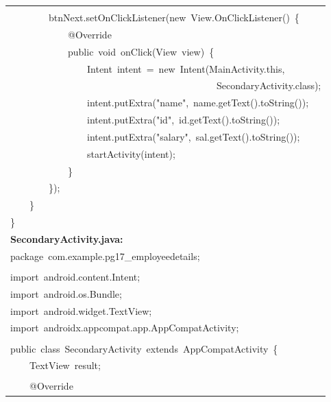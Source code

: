 \documentclass[a4paper,12pt]{article}
\begin{document}
\begin{longtable}{|p{}|}
\strut \\
{\ttfamily\small \ \ \ \ \ \ \ \ btnNext.setOnClickListener(new\ View.OnClickListener()\ \{} \\
{\ttfamily\small \ \ \ \ \ \ \ \ \ \ \ \ @Override} \\
{\ttfamily\small \ \ \ \ \ \ \ \ \ \ \ \ public\ void\ onClick(View\ view)\ \{} \\
{\ttfamily\small \ \ \ \ \ \ \ \ \ \ \ \ \ \ \ \ Intent\ intent\ =\ new\ Intent(MainActivity.this,\ } \\
{\ttfamily\small \ \ \ \ \ \ \ \ \ \ \ \ \ \ \ \ \ \ \ \ \ \ \ \ \ \ \ \ \ \ \ \ \ \ \ \ \ \ \ \ \ \ \ SecondaryActivity.class);} \\
{\ttfamily\small \ \ \ \ \ \ \ \ \ \ \ \ \ \ \ \ intent.putExtra("name",\ name.getText().toString());} \\
{\ttfamily\small \ \ \ \ \ \ \ \ \ \ \ \ \ \ \ \ intent.putExtra("id",\ id.getText().toString());} \\
{\ttfamily\small \ \ \ \ \ \ \ \ \ \ \ \ \ \ \ \ intent.putExtra("salary",\ sal.getText().toString());} \\
{\ttfamily\small \ \ \ \ \ \ \ \ \ \ \ \ \ \ \ \ startActivity(intent);} \\
{\ttfamily\small \ \ \ \ \ \ \ \ \ \ \ \ \}} \\
{\ttfamily\small \ \ \ \ \ \ \ \ \});} \\
{\ttfamily\small \ \ \ \ \}} \\
{\ttfamily\small \}} \\
\hline
\rule{0pt}{13pt}\textbf{SecondaryActivity.java:} \\
\hline
{\ttfamily\small package\ com.example.pg17\_employeedetails;} \\
\strut \\
{\ttfamily\small import\ android.content.Intent;} \\
{\ttfamily\small import\ android.os.Bundle;} \\
{\ttfamily\small import\ android.widget.TextView;} \\
{\ttfamily\small import\ androidx.appcompat.app.AppCompatActivity;} \\
\strut \\
{\ttfamily\small public\ class\ SecondaryActivity\ extends\ AppCompatActivity\ \{} \\
{\ttfamily\small \ \ \ \ TextView\ result;} \\
\strut \\
{\ttfamily\small \ \ \ \ @Override} \\

\end{longtable}
\end{document}
